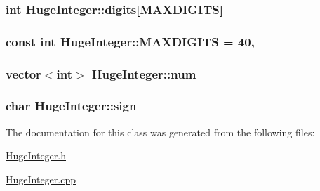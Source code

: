 \subsubsection[{\texorpdfstring{digits}{digits}}]{\setlength{\rightskip}{0pt plus 5cm}int Huge\+Integer\+::digits\mbox{[}{\bf M\+A\+X\+D\+I\+G\+I\+TS}\mbox{]}\hspace{0.3cm}{\ttfamily [private]}}\hypertarget{classHugeInteger_ab0bd42ce92321df91e3a9a11897cdb8a}{}\label{classHugeInteger_ab0bd42ce92321df91e3a9a11897cdb8a}
\subsubsection[{\texorpdfstring{M\+A\+X\+D\+I\+G\+I\+TS}{MAXDIGITS}}]{\setlength{\rightskip}{0pt plus 5cm}const int Huge\+Integer\+::\+M\+A\+X\+D\+I\+G\+I\+TS = 40\hspace{0.3cm}{\ttfamily [static]}, {\ttfamily [private]}}\hypertarget{classHugeInteger_a35ff958aa09161b192b69b1de876dab3}{}\label{classHugeInteger_a35ff958aa09161b192b69b1de876dab3}
\subsubsection[{\texorpdfstring{num}{num}}]{\setlength{\rightskip}{0pt plus 5cm}vector$<$int$>$ Huge\+Integer\+::num\hspace{0.3cm}{\ttfamily [private]}}\hypertarget{classHugeInteger_a3d21e9f761dfb49fb6559389685af830}{}\label{classHugeInteger_a3d21e9f761dfb49fb6559389685af830}
\subsubsection[{\texorpdfstring{sign}{sign}}]{\setlength{\rightskip}{0pt plus 5cm}char Huge\+Integer\+::sign\hspace{0.3cm}{\ttfamily [private]}}\hypertarget{classHugeInteger_a0ac2a85dbda0bd78e0df91fb6d6e2397}{}\label{classHugeInteger_a0ac2a85dbda0bd78e0df91fb6d6e2397}


The documentation for this class was generated from the following files\+:\begin{DoxyCompactItemize}
\item 
\hyperlink{HugeInteger_8h}{Huge\+Integer.\+h}\item 
\hyperlink{HugeInteger_8cpp}{Huge\+Integer.\+cpp}\end{DoxyCompactItemize}
